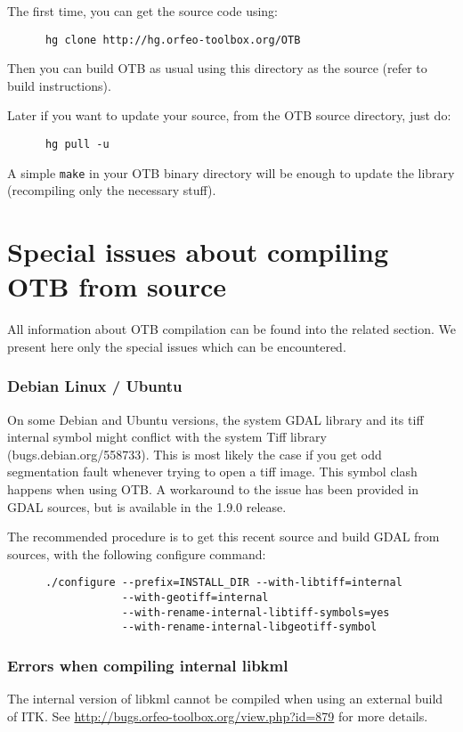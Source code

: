The first time, you can get the source code using:
\begin{verbatim}
      hg clone http://hg.orfeo-toolbox.org/OTB
\end{verbatim}

Then you can build OTB as usual using this directory as the source (refer to build instructions).

Later if you want to update your source, from the OTB source directory, just do:
\begin{verbatim}
      hg pull -u
\end{verbatim}

A simple \texttt{make} in your OTB binary directory will be enough to update the library (recompiling only the necessary stuff).


\section{Special issues about compiling OTB from source}
\label{sec:FAQInstall}

All information about OTB compilation can be found into the related section.
We present here only the special issues which can be encountered.

\subsubsection{Debian Linux / Ubuntu}

On some Debian and Ubuntu versions, the system GDAL library and its tiff internal symbol might conflict with the system Tiff library (bugs.debian.org/558733). This is most likely the case if you get odd segmentation fault whenever trying to open a tiff image. This symbol clash happens when using OTB. A workaround to the issue has been provided in GDAL sources, but is available in the 1.9.0 release.

The recommended procedure is to get this recent source and build GDAL from sources, with the following configure command:
  \begin{verbatim}
      ./configure --prefix=INSTALL_DIR --with-libtiff=internal
                  --with-geotiff=internal
                  --with-rename-internal-libtiff-symbols=yes
                  --with-rename-internal-libgeotiff-symbol
  \end{verbatim}

\subsubsection{Errors when compiling internal libkml}
The internal version of libkml cannot be compiled when using an external build of ITK.
See \url{http://bugs.orfeo-toolbox.org/view.php?id=879} for more details.

